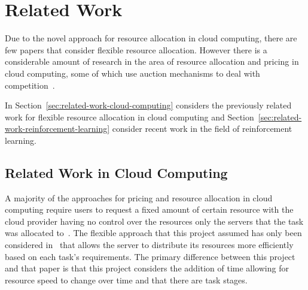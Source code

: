 \chapter{Related Work}\label{ch:background-literature} %
Due to the novel approach for resource allocation in cloud computing, there are few papers that consider flexible
resource allocation. However there is a considerable amount of research in the area of resource allocation and
pricing in cloud computing, some of which use auction mechanisms to deal with
competition~\cite{KUMAR2017234,Zhang2017,Du2019,Bi2019}.

In Section~\ref{sec:related-work-cloud-computing} considers the previously related work for flexible resource
allocation in cloud computing and Section~\ref{sec:related-work-reinforcement-learning} consider recent
work in the field of reinforcement learning.

\section{Related Work in Cloud Computing}\label{sec:related-work-in-cloud-computing}
A majority of the approaches for pricing and resource allocation in cloud computing require users to request a
fixed amount of certain resource with the cloud provider having no control over the resources only the servers that the
task was allocated to~\citep{KUMAR2017234,Zhang2017,Du2019,Bi2019}. The flexible approach that this project
assumed has only been considered in~\cite{FlexibleResourceAllocation} that allows the server to distribute its resources
more efficiently based on each task's requirements. The primary difference between this project and that paper is that this
project considers the addition of time allowing for resource speed to change over time and that there are task stages.

